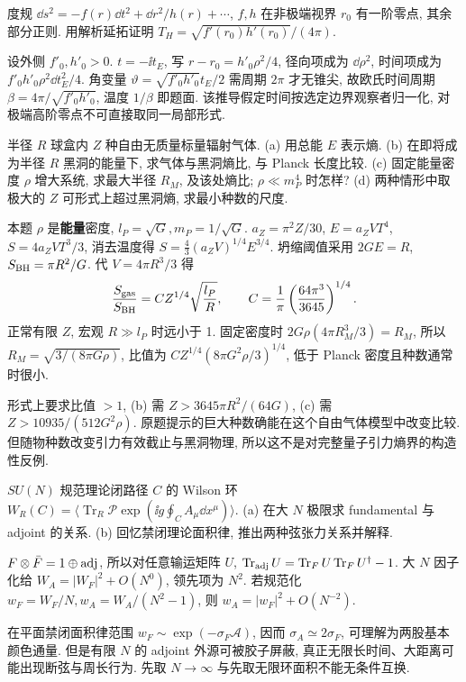 \begin{exercise}
度规 $\dd s^2=-f(r)\dd t^2+\dd r^2/h(r)+\cdots$, $f,h$ 在非极端视界 $r_0$ 有一阶零点, 其余部分正则. 用解析延拓证明 $T_H=\sqrt{f'(r_0)h'(r_0)}/(4\pi)$.
\end{exercise}
\begin{solution}
设外侧 $f'_0,h'_0>0$. $t=-\ii t_E$, 写 $r-r_0=h'_0\rho^2/4$, 径向项成为 $\dd\rho^2$, 时间项成为 $f'_0h'_0\rho^2\dd t_E^2/4$. 角变量 $\vartheta=\sqrt{f'_0h'_0}t_E/2$ 需周期 $2\pi$ 才无锥尖, 故欧氏时间周期 $\beta=4\pi/\sqrt{f'_0h'_0}$, 温度 $1/\beta$ 即题面. 该推导假定时间按选定边界观察者归一化, 对极端高阶零点不可直接取同一局部形式.
\end{solution}

\begin{exercise}
半径 $R$ 球盒内 $Z$ 种自由无质量标量辐射气体.
(a) 用总能 $E$ 表示熵.
(b) 在即将成为半径 $R$ 黑洞的能量下, 求气体与黑洞熵比, 与 Planck 长度比较.
(c) 固定能量密度 $\rho$ 增大系统, 求最大半径 $R_M$, 及该处熵比; $\rho\ll m_P^4$ 时怎样?
(d) 两种情形中取极大的 $Z$ 可形式上超过黑洞熵, 求最小种数的尺度.
\end{exercise}
\begin{solution}
本题 $\rho$ 是\textbf{能量}密度, $l_P=\sqrt G,m_P=1/\sqrt G$. $a_Z=\pi^2Z/30$, $E=a_ZVT^4$, $S=4a_ZVT^3/3$, 消去温度得 $S=\frac43(a_ZV)^{1/4}E^{3/4}$. 坍缩阈值采用 $2GE=R$, $S_{\rm BH}=\pi R^2/G$. 代 $V=4\pi R^3/3$ 得
\[
\frac{S_{\rm gas}}{S_{\rm BH}}=
C Z^{1/4}\sqrt{\frac{l_P}R},\qquad
C=\frac1\pi\left(\frac{64\pi^3}{3645}\right)^{1/4}.
\]
正常有限 $Z$, 宏观 $R\gg l_P$ 时远小于 1. 固定密度时 $2G\rho(4\pi R_M^3/3)=R_M$, 所以 $R_M=\sqrt{3/(8\pi G\rho)}$, 比值为 $CZ^{1/4}(8\pi G^2\rho/3)^{1/4}$, 低于 Planck 密度且种数通常时很小.

形式上要求比值 $>1$, (b) 需 $Z>3645\pi R^2/(64G)$, (c) 需 $Z>10935/(512G^2\rho)$. 原题提示的巨大种数确能在这个自由气体模型中改变比较. 但随物种数改变引力有效截止与黑洞物理, 所以这不是对完整量子引力熵界的构造性反例.
\end{solution}

\begin{exercise}
$SU(N)$ 规范理论闭路径 $C$ 的 Wilson 环 $W_R(C)=\langle\operatorname{Tr}_R\mathcal P\exp(\ii g\oint_C A_\mu\dd x^\mu)\rangle$.
(a) 在大 $N$ 极限求 fundamental 与 adjoint 的关系.
(b) 回忆禁闭理论面积律, 推出两种弦张力关系并解释.
\end{exercise}
\begin{solution}
$F\otimes\bar F=1\oplus{\rm adj}$, 所以对任意输运矩阵 $U$, $\operatorname{Tr}_{\rm adj}U=\operatorname{Tr}_FU\operatorname{Tr}_FU^\dagger-1$. 大 $N$ 因子化给 $W_A=|W_F|^2+O(N^0)$, 领先项为 $N^2$. 若规范化 $w_F=W_F/N,w_A=W_A/(N^2-1)$, 则 $w_A=|w_F|^2+O(N^{-2})$.

在平面禁闭面积律范围 $w_F\sim\exp(-\sigma_F\mathcal A)$, 因而 $\sigma_A\simeq2\sigma_F$, 可理解为两股基本颜色通量. 但是有限 $N$ 的 adjoint 外源可被胶子屏蔽, 真正无限长时间、大距离可能出现断弦与周长行为. 先取 $N\to\infty$ 与先取无限环面积不能无条件互换.
\end{solution}

